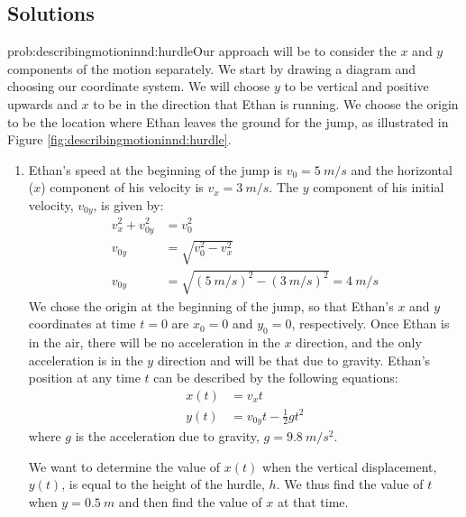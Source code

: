 \subsection{Solutions}
\begin{solution}{prob:describingmotioninnd:hurdle}\label{soln:describingmotioninnd:hurdle}Our approach will be to consider the $x$ and $y$ components of the motion separately. We start by drawing a diagram and choosing our coordinate system. We will choose $y$ to be vertical and positive upwards and $x$ to be in the direction that Ethan is running. We choose the origin to be the location where Ethan leaves the ground for the jump, as illustrated in Figure  \ref{fig:describingmotioninnd:hurdle}.


\begin{enumerate}[label=\alph*)]
\item Ethan's speed at the beginning of the jump is $v_0=\SI{5}{m/s}$ and the horizontal ($x$) component of his velocity is $v_x=\SI{3}{m/s}$.  The $y$ component of his initial velocity, $v_{0y}$, is given by: 
\begin{align*}
v_x^2+v_{0y}^2&=v_0^2\\
v_{0y}&=\sqrt{v_0^2-v_x^2}\\
v_{0y}&=\sqrt{(\SI{5}{m/s})^2-(\SI{3}{m/s})^2}=\SI{4}{m/s}
\end{align*}
We chose the origin at the beginning of the jump, so that Ethan's $x$ and $y$ coordinates at time $t=0$ are $x_0=0$ and $y_0=0$, respectively. Once Ethan is in the air, there will be no acceleration in the $x$ direction, and the only acceleration is in the $y$ direction and will be that due to gravity.
Ethan's position at any time $t$ can be described by the following equations: 
\begin{align*}
x(t)&=v_{x}t\\
y(t)&=v_{0y}t-\frac{1}{2}gt^2
\end{align*}
where $g$ is the acceleration due to gravity, $g=\SI{9.8}{m/s^2}$.

We want to determine the value of $x(t)$ when the vertical displacement, $y(t)$, is equal to the height of the hurdle, $h$. We thus find the value of $t$ when $y=\SI{0.5}{m}$ and then find the value of $x$ at that time.


\end{enumerate}
\end{solution}
